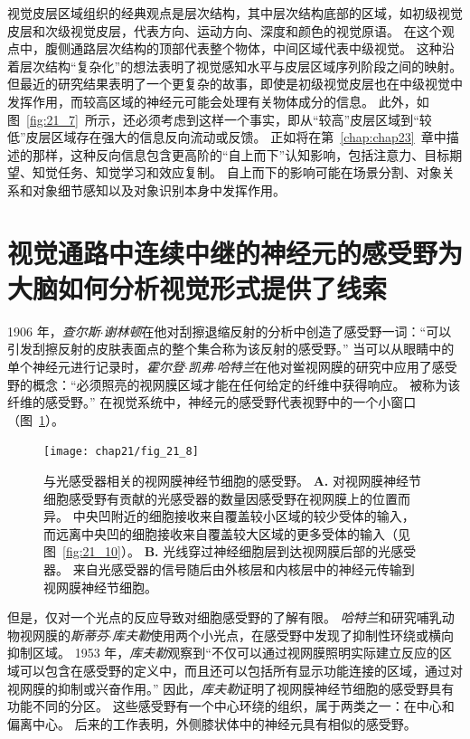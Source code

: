 视觉皮层区域组织的经典观点是层次结构，其中层次结构底部的区域，如初级视觉皮层和次级视觉皮层，代表方向、运动方向、深度和颜色的视觉原语。
在这个观点中，腹侧通路层次结构的顶部代表整个物体，中间区域代表中级视觉。
这种沿着层次结构“复杂化”的想法表明了视觉感知水平与皮层区域序列阶段之间的映射。
但最近的研究结果表明了一个更复杂的故事，即使是初级视觉皮层也在中级视觉中发挥作用，而较高区域的神经元可能会处理有关物体成分的信息。
此外，如图~\ref{fig:21_7}~所示，还必须考虑到这样一个事实，即从“较高”皮层区域到“较低”皮层区域存在强大的信息反向流动或反馈。
正如将在第~\ref{chap:chap23}~章中描述的那样，这种反向信息包含更高阶的“自上而下”认知影响，包括注意力、目标期望、知觉任务、知觉学习和效应复制。
自上而下的影响可能在场景分割、对象关系和对象细节感知以及对象识别本身中发挥作用。



\section{视觉通路中连续中继的神经元的感受野为大脑如何分析视觉形式提供了线索}

1906 年，\textit{查尔斯$\cdot$谢林顿}在他对刮擦退缩反射的分析中创造了感受野一词：“可以引发刮擦反射的皮肤表面点的整个集合称为该反射的感受野。” 
当可以从眼睛中的单个神经元进行记录时，\textit{霍尔登$\cdot$凯弗$\cdot$哈特兰}在他对鲎视网膜的研究中应用了感受野的概念：“必须照亮的视网膜区域才能在任何给定的纤维中获得响应。
被称为该纤维的感受野。” 
在视觉系统中，神经元的感受野代表视野中的一个小窗口（图~\ref{fig:21_8}）。


\begin{figure}[htbp]
	\centering
	\texttt{[image: chap21/fig\_21\_8]}
	\caption{与光感受器相关的视网膜神经节细胞的感受野。
		\textbf{A.} 对视网膜神经节细胞感受野有贡献的光感受器的数量因感受野在视网膜上的位置而异。
		中央凹附近的细胞接收来自覆盖较小区域的较少受体的输入，而远离中央凹的细胞接收来自覆盖较大区域的更多受体的输入（见图~\ref{fig:21_10}）。
		\textbf{B.} 光线穿过神经细胞层到达视网膜后部的光感受器。
		来自光感受器的信号随后由外核层和内核层中的神经元传输到视网膜神经节细胞。}
	\label{fig:21_8}
\end{figure}


但是，仅对一个光点的反应导致对细胞感受野的了解有限。
\textit{哈特兰}和研究哺乳动物视网膜的\textit{斯蒂芬$\cdot$库夫勒}使用两个小光点，在感受野中发现了抑制性环绕或横向抑制区域。
1953 年，\textit{库夫勒}观察到“不仅可以通过视网膜照明实际建立反应的区域可以包含在感受野的定义中，而且还可以包括所有显示功能连接的区域，通过对视网膜的抑制或兴奋作用。” 
因此，\textit{库夫勒}证明了视网膜神经节细胞的感受野具有功能不同的分区。
这些感受野有一个中心环绕的组织，属于两类之一：在中心和偏离中心。
后来的工作表明，外侧膝状体中的神经元具有相似的感受野。


